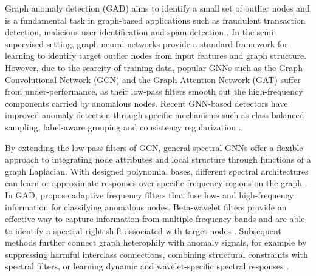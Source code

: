 Graph anomaly detection (GAD) aims to identify a small set of outlier nodes and is a fundamental task in graph-based applications such as fraudulent transaction detection, malicious user identification and spam detection \citep{GADSurvey, GADBench}.
In the semi-supervised setting, graph neural networks provide a standard framework for learning to identify target outlier nodes from input features and graph structure.
However, due to the scarcity of training data, popular GNNs such as the Graph Convolutional Network (GCN) \citep{GCN} and the Graph Attention Network (GAT) \citep{GAT} suffer from under-performance, as their low-pass filters smooth out the high-frequency components carried by anomalous nodes.
Recent GNN-based detectors have improved anomaly detection through specific mechanisms such as class-balanced sampling, label-aware grouping and consistency regularization \citep{PCGNN,GAGA,ConsisGAD}.

By extending the low-pass filters of GCN, general spectral GNNs offer a flexible approach to integrating node attributes and local structure through functions of a graph Laplacian.
With designed polynomial bases, different spectral architectures can learn or approximate responses over specific frequency regions on the graph \citep{defferrard2016convolutional,BernNet}.
In GAD, \citet{AMNet} propose adaptive frequency filters that fuse low- and high-frequency information for classifying anomalous nodes.
Beta-wavelet filters provide an effective way to capture information from multiple frequency bands and are able to identify a spectral right-shift associated with target nodes \citep{BWGNN}.
Subsequent methods further connect graph heterophily with anomaly signals, for example by suppressing harmful interclass connections, combining structural constraints with spectral filters, or learning dynamic and wavelet-specific spectral responses \citep{GHRN,SEC-GFD,DSGAD,ChiGAD}.

